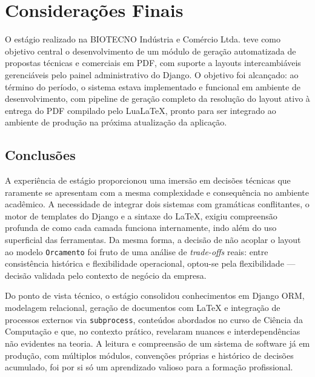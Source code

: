 
\chapter{Considerações Finais}
\label{cap:consideracoes}

O estágio realizado na BIOTECNO Indústria e Comércio Ltda. teve como objetivo central o desenvolvimento
de um módulo de geração automatizada de propostas técnicas e comerciais em PDF, com suporte a layouts
intercambiáveis gerenciáveis pelo painel administrativo do Django. O objetivo foi alcançado: ao término
do período, o sistema estava implementado e funcional em ambiente de desenvolvimento, com pipeline de
geração completo da resolução do layout ativo à entrega do PDF compilado pelo LuaLaTeX, pronto
para ser integrado ao ambiente de produção na próxima atualização da aplicação.

\section{Conclusões}
\label{sec:conclusoes}

A experiência de estágio proporcionou uma imersão em decisões técnicas que raramente se apresentam com
a mesma complexidade e consequência no ambiente acadêmico. A necessidade de integrar dois sistemas com
gramáticas conflitantes, o motor de templates do Django e a sintaxe do LaTeX, exigiu compreensão
profunda de como cada camada funciona internamente, indo além do uso superficial das ferramentas. Da
mesma forma, a decisão de não acoplar o layout ao modelo \texttt{Orcamento} foi fruto de uma análise
de \textit{trade-offs} reais: entre consistência histórica e flexibilidade operacional, optou-se pela
flexibilidade — decisão validada pelo contexto de negócio da empresa.

Do ponto de vista técnico, o estágio consolidou conhecimentos em Django ORM, modelagem relacional,
geração de documentos com LaTeX e integração de processos externos via \texttt{subprocess}, conteúdos
abordados no curso de Ciência da Computação e que, no contexto prático, revelaram nuances e
interdependências não evidentes na teoria. A leitura e compreensão de um sistema de software já em
produção, com múltiplos módulos, convenções próprias e histórico de decisões acumulado, foi por si só
um aprendizado valioso para a formação profissional.

